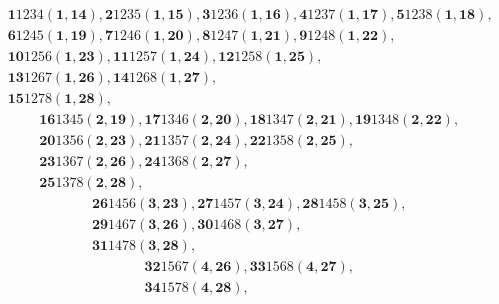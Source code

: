 \documentclass[aps, preprint]{revtex4}
\begin{document}
\begin{align} & \mathbf{1}1234 \left (\mathbf{1} ,\mathbf{14}\right ) ,\mathbf{2}1235 \left (\mathbf{1} ,\mathbf{15}\right ) ,\mathbf{3}1236 \left (\mathbf{1} ,\mathbf{16}\right ) ,\mathbf{4}1237 \left (\mathbf{1} ,\mathbf{17}\right ) ,\mathbf{5}1238 \left (\mathbf{1} ,\mathbf{18}\right )\text{,} \\
 & \mathbf{6}1245 \left (\mathbf{1} ,\mathbf{19}\right ) ,\mathbf{7}1246 \left (\mathbf{1} ,\mathbf{20}\right ) ,\mathbf{8}1247 \left (\mathbf{1} ,\mathbf{21}\right ) ,\mathbf{9}1248 \left (\mathbf{1} ,\mathbf{22}\right )\text{,} \\
 & \mathbf{10}1256 \left (\mathbf{1} ,\mathbf{23}\right ) ,\mathbf{11}1257 \left (\mathbf{1} ,\mathbf{24}\right ) ,\mathbf{12}1258 \left (\mathbf{1} ,\mathbf{25}\right )\text{,} \\
 & \mathbf{13}1267 \left (\mathbf{1} ,\mathbf{26}\right ) ,\mathbf{14}1268 \left (\mathbf{1} ,\mathbf{27}\right )\text{,} \\
 & \mathbf{15}1278 \left (\mathbf{1} ,\mathbf{28}\right )\text{,}\end{align}
\begin{align} & \mathbf{16}1345 \left (\mathbf{2} ,\mathbf{19}\right ) ,\mathbf{17}1346 \left (\mathbf{2} ,\mathbf{20}\right ) ,\mathbf{18}1347 \left (\mathbf{2} ,\mathbf{21}\right ) ,\mathbf{19}1348 \left (\mathbf{2} ,\mathbf{22}\right )\text{,} \\
 & \mathbf{20}1356 \left (\mathbf{2} ,\mathbf{23}\right ) ,\mathbf{21}1357 \left (\mathbf{2} ,\mathbf{24}\right ) ,\mathbf{22}1358 \left (\mathbf{2} ,\mathbf{25}\right )\text{,} \\
 & \mathbf{23}1367 \left (\mathbf{2} ,\mathbf{26}\right ) ,\mathbf{24}1368 \left (\mathbf{2} ,\mathbf{27}\right )\text{,} \\
 & \mathbf{25}1378 \left (\mathbf{2} ,\mathbf{28}\right )\text{,}\end{align}
\begin{align} & \mathbf{26}1456 \left (\mathbf{3} ,\mathbf{23}\right ) ,\mathbf{27}1457 \left (\mathbf{3} ,\mathbf{24}\right ) ,\mathbf{28}1458 \left (\mathbf{3} ,\mathbf{25}\right )\text{,} \\
 & \mathbf{29}1467 \left (\mathbf{3} ,\mathbf{26}\right ) ,\mathbf{30}1468 \left (\mathbf{3} ,\mathbf{27}\right )\text{,} \\
 & \mathbf{31}1478 \left (\mathbf{3} ,\mathbf{28}\right )\text{,}\end{align}
\begin{align} & \mathbf{32}1567 \left (\mathbf{4} ,\mathbf{26}\right ) ,\mathbf{33}1568 \left (\mathbf{4} ,\mathbf{27}\right )\text{,} \\
 & \mathbf{34}1578 \left (\mathbf{4} ,\mathbf{28}\right )\text{,}\end{align}
\end{document}
